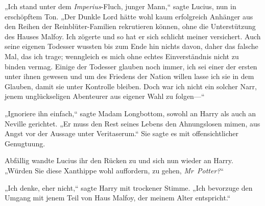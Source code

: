 „Ich stand unter dem \emph{Imperius}-Fluch, junger Mann,“ sagte Lucius, nun in erschöpftem Ton. „Der Dunkle Lord hätte wohl kaum erfolgreich Anhänger aus den Reihen der Reinblüter-Familien rekrutieren können, ohne die Unterstützung des Hauses Malfoy. Ich zögerte und so hat er sich schlicht meiner versichert. Auch seine eigenen Todesser wussten bis zum Ende hin nichts davon, daher das falsche Mal, das ich trage; wenngleich es mich ohne echtes Einverständnis nicht zu binden vermag. Einige der Todesser glauben noch immer, ich sei einer der ersten unter ihnen gewesen und um des Friedens der Nation willen lasse ich sie in dem Glauben, damit sie unter Kontrolle bleiben. Doch war ich nicht ein solcher Narr, jenem unglückseligen Abenteurer aus eigener Wahl zu folgen—“

„Ignoriere ihn einfach,“ sagte Madam Longbottom, sowohl an Harry als auch an Neville gerichtet. „Er muss den Rest seines Lebens den Ahnungslosen mimen, aus Angst vor der Aussage unter Veritaserum.“ Sie sagte es mit offensichtlicher Genugtuung.

Abfällig wandte Lucius ihr den Rücken zu und sich nun wieder an Harry. „Würden Sie diese Xanthippe wohl auffordern, zu gehen, \emph{Mr~Potter?}“

„Ich denke, eher nicht,“ sagte Harry mit trockener Stimme. „Ich bevorzuge den Umgang mit jenem Teil von Haus Malfoy, der meinem Alter entspricht.“

